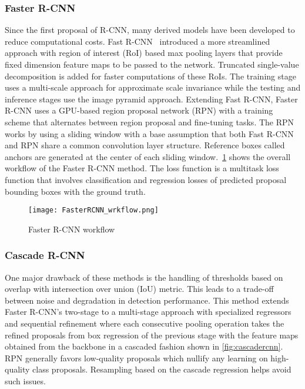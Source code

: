 \documentclass{article}
\begin{document}
\subsubsection{Faster R-CNN}
\label{subsubsec: Faster R-CNN}

Since the first proposal of R-CNN, many derived models have been developed to reduce computational costs. Fast R-CNN~\cite{2015Ross} introduced a more streamlined approach with region of interest (RoI) based max pooling layers that provide fixed dimension feature maps to be passed to the network. Truncated single-value decomposition is added for faster computations of these RoIs. The training stage uses a multi-scale approach for approximate scale invariance while the testing and inference stages use the image pyramid approach. Extending Fast R-CNN, Faster R-CNN uses a GPU-based region proposal network (RPN) with a training scheme that alternates between region proposal and fine-tuning tasks. The RPN works by using a sliding window with a base assumption that both Fast R-CNN and RPN share a common convolution layer structure. Reference boxes called anchors are generated at the center of each sliding window.~\cref{fig:fasterrcnn} shows the overall workflow of the Faster R-CNN method. The loss function is a multitask loss function that involves classification and regression losses of predicted proposal bounding boxes with the ground truth.

\begin{figure}[!htb]
\centering
\texttt{[image: FasterRCNN\_wrkflow.png]}
\caption{Faster R-CNN workflow}
\label{fig:fasterrcnn}
\end{figure}


\subsubsection{Cascade R-CNN}
\label{subsubsec: Cascade R-CNN}

One major drawback of these methods is the handling of thresholds based on overlap with intersection over union (IoU) metric. This leads to a trade-off between noise and degradation in detection performance. This method extends Faster R-CNN's two-stage to a multi-stage approach with specialized regressors and sequential refinement where each consecutive pooling operation takes the refined proposals from box regression of the previous stage with the feature maps obtained from the backbone in a cascaded fashion shown in \cref{fig:cascadercnn}. RPN generally favors low-quality proposals which nullify any learning on high-quality class proposals. Resampling based on the cascade regression helps avoid such issues. 
\end{document}
